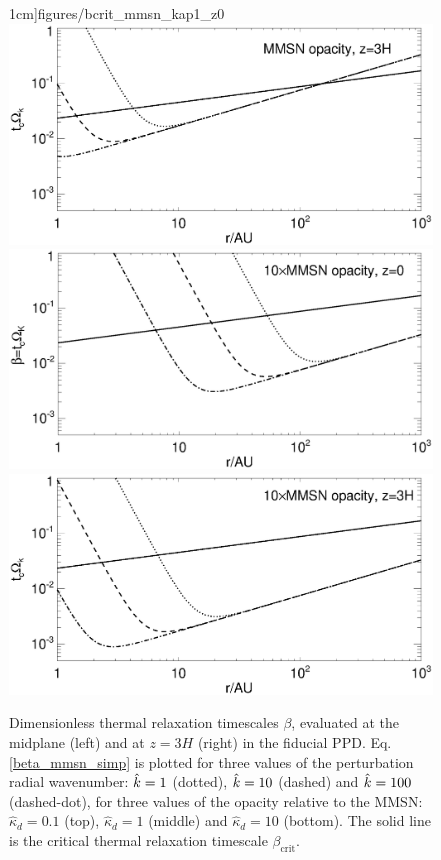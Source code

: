\begin{figure}
  1cm]{figures/bcrit_mmsn_kap1_z0}\includegraphics[scale=.47,clip=true,trim=2.5cm
  1.8cm 0cm 1cm]{figures/bcrit_mmsn_kap1_z3}\\
  \includegraphics[scale=.47,clip=true,trim=0cm 0cm 0cm
  1cm]{figures/bcrit_mmsn_kap10_z0}\includegraphics[scale=.47,clip=true,trim=2.5cm 0cm 0cm
  1cm]{figures/bcrit_mmsn_kap10_z3} 
  \caption{Dimensionless thermal relaxation timescales $\beta$,
    evaluated at the midplane (left) and at $z=3H$ (right) in the
    fiducial PPD. Eq. \ref{beta_mmsn_simp} is plotted  
    for three values of the 
    perturbation radial wavenumber: $\hat{k}=1$ (dotted), $\hat{k}=10$
    (dashed) and $\hat{k}=100$ (dashed-dot), for three values of the
    opacity relative to the MMSN: $\hat{\kappa}_d=0.1$ (top),
    $\hat{\kappa}_d=1$ (middle) and $\hat{\kappa}_d=10$ (bottom).  
    The solid line is the 
    critical thermal relaxation timescale $\beta_\mathrm{crit}$.  
    \label{mmsn_bcrit_bcool}}   
\end{figure}  

